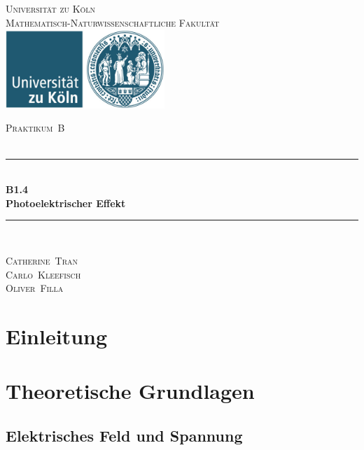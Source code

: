 \documentclass[12pt,a4paper]{scrartcl}
\numberwithin{equation}{section} %
\newcommand{\HRule}{\rule{\linewidth}{0.7mm}}
\begin{document}
\begin{titlepage}
	\pagestyle{empty}

	\begin{center}

	\textsc{\LARGE Universität zu Köln }\\ [0.4cm]
	\textsc{Mathematisch-Naturwissenschaftliche Fakultät} \\[1.5cm]

	\includegraphics[width=0.45\textwidth]{../media/uni.jpg}  %

	\textsc{\Large Praktikum~B}\\[2mm]
	\textsc{}\\[10mm]
	\HRule \\[0.4cm]

		{	\Huge \bfseries B1.4}\\[0.4cm]
			{	\huge \bfseries Photoelektrischer Effekt}\\[0.3cm]
	
	\HRule \\[3cm]

 	\begin{center}
		\textsc{\Large Catherine~Tran } \\[3pt]
		\textsc{\Large Carlo~Kleefisch } \\[3pt]
		\textsc{\Large Oliver~Filla } \\[3pt]
	\end{center}
	\end{center}
\end{titlepage}

\newpage
\tableofcontents
\newpage

\clearpage
\hypertarget{einleitung}{%
\section{Einleitung}\label{einleitung}}

\clearpage
\hypertarget{theoretische-grundlagen}{%
\section{Theoretische Grundlagen}\label{theoretische-grundlagen}}
\subsection{Elektrisches Feld und Spannung}
\end{document}
